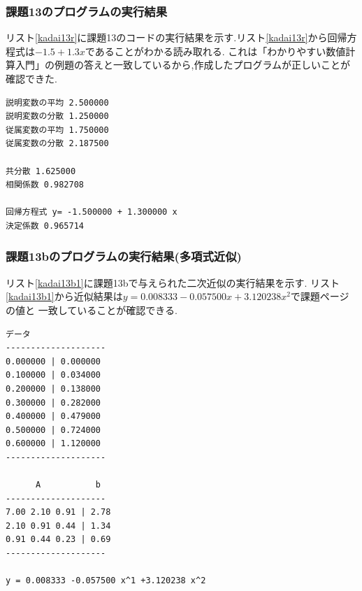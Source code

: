 \documentclass[a4j]{jarticle}
\begin{document}
      \subsubsection{課題13のプログラムの実行結果}
      リスト\ref{kadai13r}に課題13のコードの実行結果を示す.リスト\ref{kadai13r}から回帰方程式は$-1.5+1.3x$であることがわかる読み取れる.
      これは「わかりやすい数値計算入門」\cite{wakari}の例題の答えと一致しているから,作成したプログラムが正しいことが確認できた.
      \begin{lstlisting}[basicstyle=\ttfamily\footnotesize, frame=single,label=kadai13r,caption=課題13のプログラムの実行結果]
説明変数の平均 2.500000
説明変数の分散 1.250000
従属変数の平均 1.750000
従属変数の分散 2.187500

共分散 1.625000
相関係数 0.982708

回帰方程式 y= -1.500000 + 1.300000 x
決定係数 0.965714
      \end{lstlisting}

      \subsubsection{課題13bのプログラムの実行結果(多項式近似)}
      リスト\ref{kadai13b1}に課題13bで与えられた二次近似の実行結果を示す.
      リスト\ref{kadai13b1}から近似結果は$y = 0.008333 -0.057500 x +3.120238 x^2$で課題ページの値と
      一致していることが確認できる.
      \begin{lstlisting}[basicstyle=\ttfamily\footnotesize, frame=single,label=kadai13b1,caption=課題13bのプログラムの実行結果(多項式近似)]
       データ       
--------------------
0.000000 | 0.000000 
0.100000 | 0.034000 
0.200000 | 0.138000 
0.300000 | 0.282000 
0.400000 | 0.479000 
0.500000 | 0.724000 
0.600000 | 1.120000 
--------------------

      A           b 
--------------------
7.00 2.10 0.91 | 2.78
2.10 0.91 0.44 | 1.34
0.91 0.44 0.23 | 0.69
--------------------

y = 0.008333 -0.057500 x^1 +3.120238 x^2 
      \end{lstlisting}
\end{document}
